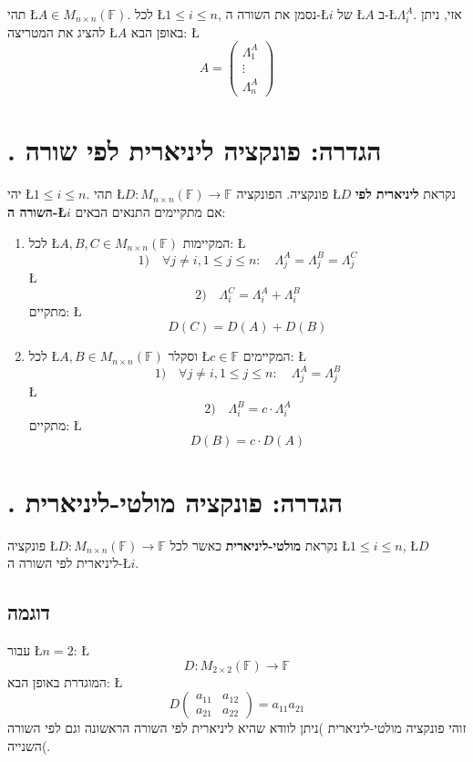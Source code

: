 \documentclass[english,hebrew]{article}
\begin{document}
תהי \L{$A\in M_{n\times n}(\mathbb{F})$}. לכל \L{$1\le i\le n$},
נסמן את השורה ה-\L{$i$} של \L{$A$} ב-\L{$\Lambda_{i}^{A}$}. אזי,
ניתן להציג את המטריצה \L{$A$} באופן הבא: \L{%
\[
A=\begin{pmatrix}\Lambda_{1}^{A}\\
\vdots\\
\Lambda_{n}^{A}
\end{pmatrix}
\]
}%

\section{{\endL}. הגדרה: פונקציה ליניארית לפי שורה}

יהי \L{$1\le i\le n$}. תהי \L{$D\colon M_{n\times n}(\mathbb{F})\to\mathbb{F}$}
פונקציה. הפונקציה \L{$D$} נקראת \textbf{ליניארית לפי השורה ה-\L{$i$}}
אם מתקיימים התנאים הבאים:
\begin{enumerate}
\item לכל \L{$A,B,C\in M_{n\times n}(\mathbb{F})$} המקיימות: \L{%
\[
1)\quad\forall j\neq i,1\le j\le n:\quad\Lambda_{j}^{A}=\Lambda_{j}^{B}=\Lambda_{j}^{C}
\]
}%
\L{%
\[
2)\quad\Lambda_{i}^{C}=\Lambda_{i}^{A}+\Lambda_{i}^{B}
\]
}%
מתקיים: \L{%
\[
D(C)=D(A)+D(B)
\]
}%
\item לכל \L{$A,B\in M_{n\times n}(\mathbb{F})$} וסקלר \L{$c\in\mathbb{F}$}
המקיימים: \L{%
\[
1)\quad\forall j\neq i,1\le j\le n:\quad\Lambda_{j}^{A}=\Lambda_{j}^{B}
\]
}%
\L{%
\[
2)\quad\Lambda_{i}^{B}=c\cdot\Lambda_{i}^{A}
\]
}%
מתקיים: \L{%
\[
D(B)=c\cdot D(A)
\]
}%
\end{enumerate}

\section{{\endL}. הגדרה: פונקציה מולטי-ליניארית}

פונקציה \L{$D\colon M_{n\times n}(\mathbb{F})\to\mathbb{F}$} נקראת
\textbf{מולטי-ליניארית} כאשר לכל \L{$1\le i\le n$}, \L{$D$} ליניארית
לפי השורה ה-\L{$i$}.

\subsection{דוגמה}

עבור \L{$n=2$}: \L{%
\[
D\colon M_{2\times2}(\mathbb{F})\to\mathbb{F}
\]
}%
המוגדרת באופן הבא: \L{%
\[
D\begin{pmatrix}a_{11} & a_{12}\\
a_{21} & a_{22}
\end{pmatrix}=a_{11}a_{21}
\]
}%
זוהי פונקציה מולטי-ליניארית )ניתן לוודא שהיא ליניארית לפי השורה הראשונה
וגם לפי השורה השנייה(.
\end{document}

